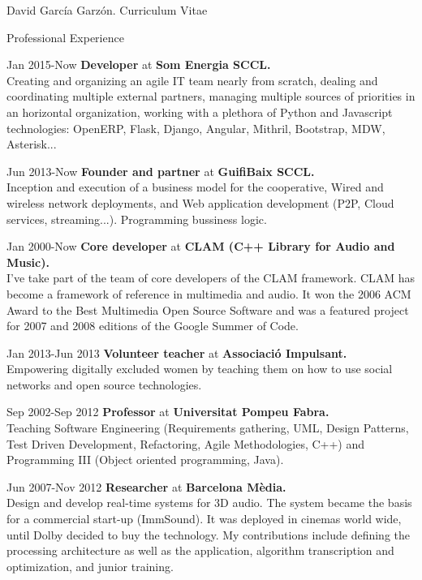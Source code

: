 \documentclass{article}
\begin{document}
\begin{cv}{David García Garzón. Curriculum Vitae}
\begin{cvlist}{Professional Experience}

\item[Jan 2015-Now]
{\bf Developer} at
{\bf Som Energia SCCL.}\\
Creating and organizing an agile IT team nearly from scratch, dealing and coordinating multiple external partners, managing multiple sources of priorities in an horizontal organization, working with a plethora of Python and Javascript technologies: OpenERP, Flask, Django, Angular, Mithril, Bootstrap, MDW, Asterisk...

\item[Jun 2013-Now]
{\bf Founder and partner} at
{\bf GuifiBaix SCCL.}\\
Inception and execution of a business model for the cooperative, Wired and wireless network deployments, and Web application development (P2P, Cloud services, streaming...). Programming bussiness logic. 

\item[Jan 2000-Now]
{\bf Core developer} at
{\bf CLAM (C++ Library for Audio and Music).}\\
I've take part of the team of core developers of the CLAM framework. CLAM has become a framework of reference in multimedia and audio. It won the 2006 ACM Award to the Best Multimedia Open Source Software and was a featured project for 2007 and 2008 editions of the Google Summer of Code.

\item[Jan 2013-Jun 2013]
{\bf Volunteer teacher} at
{\bf Associació Impulsant.}\\
Empowering digitally excluded women by teaching them on how to use social networks and open source technologies. 

\item[Sep 2002-Sep 2012]
{\bf Professor} at
{\bf Universitat Pompeu Fabra.}\\
Teaching Software Engineering (Requirements gathering, UML, Design Patterns, Test Driven Development, Refactoring, Agile Methodologies, C++) and Programming III (Object oriented programming, Java).

\item[Jun 2007-Nov 2012]
{\bf Researcher} at
{\bf Barcelona Mèdia.}\\
Design and develop real-time systems for 3D audio. The system became the basis for a commercial start-up (ImmSound). It was deployed in cinemas world wide, until Dolby decided to buy the technology. My contributions include defining the processing architecture as well as the application, algorithm transcription and optimization, and junior training. 


\end{cvlist}
\end{cv}
\end{document}
